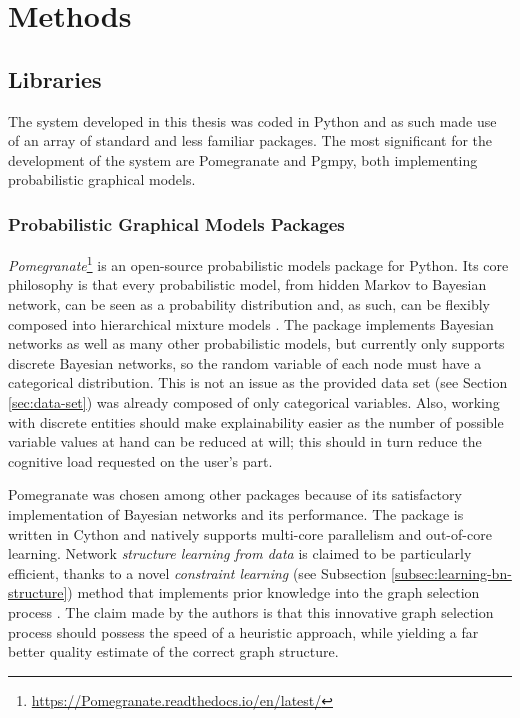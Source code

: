 \section{Methods} \label{sec:methods}

\subsection{Libraries}\label{subsec:libraries}
The system developed in this thesis was coded in Python and as such made use of an array of standard and less familiar packages.
The most significant for the development of the system are Pomegranate and Pgmpy, both implementing probabilistic graphical models.

\subsubsection{Probabilistic Graphical Models Packages}
\textit{Pomegranate}\footnote{\url{https://Pomegranate.readthedocs.io/en/latest/}} is an open-source probabilistic models package for Python.
Its core philosophy is that every probabilistic model, from hidden Markov to Bayesian network, can be seen as a probability distribution and, as such, can be flexibly composed into hierarchical mixture models \citep{Schreiber2017}.
The package implements Bayesian networks as well as many other probabilistic models, but currently only supports discrete Bayesian networks, so the random variable of each node must have a categorical distribution.
This is not an issue as the provided data set (see Section \ref{sec:data-set}) was already composed of only categorical variables.
Also, working with discrete entities should make explainability easier as the number of possible variable values at hand can be reduced at will; this should in turn reduce the cognitive load requested on the user's part.

Pomegranate was chosen among other packages because of its satisfactory implementation of Bayesian networks and its performance.
The package is written in Cython and natively supports multi-core parallelism and out-of-core learning.
Network \textit{structure learning from data} is claimed to be particularly efficient, thanks to a novel \textit{constraint learning} (see Subsection \ref{subsec:learning-bn-structure}) method that implements prior knowledge into the graph selection process \citep{schreiber_noble_2017}.
The claim made by the authors is that this innovative graph selection process should possess the speed of a heuristic approach, while yielding a far better quality estimate of the correct graph structure.

